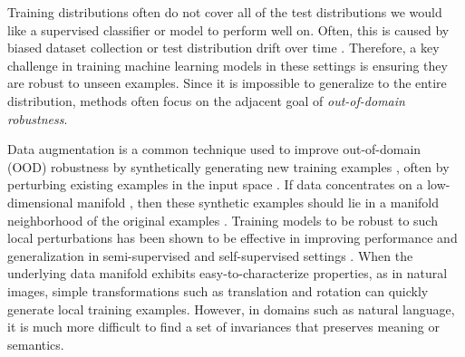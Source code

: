 Training distributions often do not cover all of the test distributions we would like a supervised classifier or model to perform well on.
Often, this is caused by biased dataset collection \citep{torralba2011unbiased} or test distribution drift over time \citep{quionera2009dataset}.
Therefore, a key challenge in training machine learning models in these settings is ensuring they are robust to unseen examples. %
Since it is impossible to generalize to the entire distribution, methods often focus on the adjacent goal of \textit{out-of-domain robustness}.

Data augmentation is a common technique used to improve out-of-domain (OOD) robustness by synthetically generating new training examples \citep{Simard1998}, often by perturbing existing examples in the input space \citep{perez2017}. 
If data concentrates on a low-dimensional manifold \citep{chapelle2006semi}, then these synthetic examples should lie in a manifold neighborhood of the original examples \citep{vicinal200olivier}.
Training models to be robust to such local perturbations has been shown to be effective in improving performance and generalization in semi-supervised and self-supervised settings \citep{bachman2014learning,szegedy2014intriguing, sajjadi2016regularization}.
When the underlying data manifold exhibits easy-to-characterize properties, as in natural images, simple transformations such as translation and rotation %
can quickly generate local training examples.
However, in domains such as natural language, it is much more difficult to find a set of invariances that preserves meaning or semantics.

